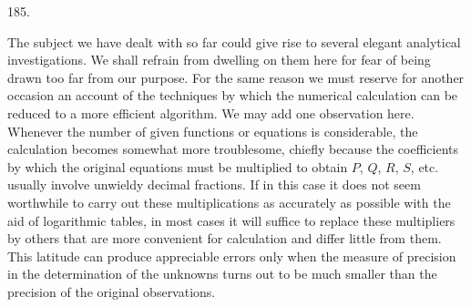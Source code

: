 \begin{center}\hypertarget{native-258-article185}{}185.\end{center}
The subject we have dealt with so far could give rise to several elegant analytical investigations. We shall refrain from dwelling on them here for fear of being drawn too far from our purpose. For the same reason we must reserve for another occasion an account of the techniques by which the numerical calculation can be reduced to a more efficient algorithm. We may add one observation here. Whenever the number of given functions or equations is considerable, the calculation becomes somewhat more troublesome, chiefly because the coefficients by which the original equations must be multiplied to obtain $P$, $Q$, $R$, $S$, etc. usually involve unwieldy decimal fractions. If in this case it does not seem worthwhile to carry out these multiplications as accurately as possible with the aid of logarithmic tables, in most cases it will suffice to replace these multipliers by others that are more convenient for calculation and differ little from them. This latitude can produce appreciable errors only when the measure of precision in the determination of the unknowns turns out to be much smaller than the precision of the original observations.

